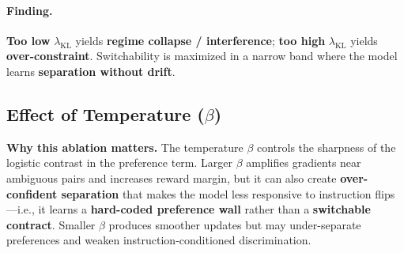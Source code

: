 \vspace{-0.15em}
\paragraph{\textbf{Finding.}}
\textbf{Too low} $\lambda_{\text{KL}}$ yields \textbf{regime collapse / interference}; \textbf{too high} $\lambda_{\text{KL}}$ yields \textbf{over-constraint}.
Switchability is maximized in a narrow band where the model learns \textbf{separation without drift}.

\subsection{Effect of Temperature ($\beta$)}

\vspace{-0.25em}
\noindent
\textbf{Why this ablation matters.}
The temperature $\beta$ controls the sharpness of the logistic contrast in the preference term.
Larger $\beta$ amplifies gradients near ambiguous pairs and increases reward margin, but it can also create \textbf{over-confident separation} that makes the model less responsive to instruction flips---i.e., it learns a \textbf{hard-coded preference wall} rather than a \textbf{switchable contract}.
Smaller $\beta$ produces smoother updates but may under-separate preferences and weaken instruction-conditioned discrimination.

\begin{table}[ht!]
\centering
\normalsize
\renewcommand{\arraystretch}{1.2}
\caption{\textbf{Effect of temperature on preference learning and switchability.} Larger $\beta$ increases separation (margin, accuracy) but can reduce instruction-conditioned switching, revealing a margin--switchability trade-off.}
\label{tab:beta_ablation}
\end{table}

